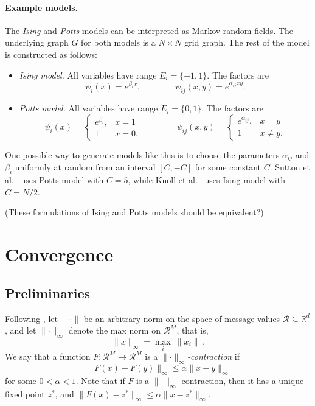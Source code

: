 \documentclass[11pt,a4paper]{article}
\theoremstyle{remark}
\newcommand{\Reals}{\mathbb{R}}
\newcommand{\R}{\mathcal{R}}
\newcommand{\range}{E}
\newcommand{\norm}[1]{\lVert #1 \rVert}
\begin{document}
\paragraph{Example models.} The \emph{Ising} and \emph{Potts} models can be interpreted as Markov random fields. The underlying graph $G$ for both models is a $N \times N$ grid graph. The rest of the model is constructed as follows:
\begin{itemize}
    \item \emph{Ising model.} All variables have range $\range_{i} = \{ -1, 1 \}$. The factors are
    \begin{equation*}
        \psi_i(x) = e^{\beta_{i} x}, \qquad\qquad
        \psi_{ij}(x,y) = e^{\alpha_{ij}xy}.
    \end{equation*}
    \item \emph{Potts model.} All variables have range $\range_{i} = \{ 0, 1 \}$. The factors are
    \begin{equation*}
        \psi_i(x) = \begin{cases} e^{\beta_{i}}, & x = 1 \\1 & x = 0, \end{cases} \qquad\qquad
        \psi_{ij}(x,y) = \begin{cases} e^{\alpha_{ij}}, & x = y \\1 & x \ne y. \end{cases}
    \end{equation*}
\end{itemize}
One possible way to generate models like this is to choose the parameters $\alpha_{ij}$ and $\beta_i$ uniformly at random from an interval $[C, -C]$ for some constant $C$. Sutton et al.~\cite{Sutton:2007:IDS:3020488.3020534} uses Potts model with $C = 5$, while Knoll et al.~\cite{10.1007/978-3-319-23525-7_18} uses Ising model with $C = N/2$.

(These formulations of Ising and Potts models should be equivalent?)


\section{Convergence}

\subsection{Preliminaries}

Following \cite{elidan2006residual}, let $\norm{\cdot}$ be an arbitrary norm on the space of message values $\R \subseteq \Reals^d$, and let $\norm{\cdot}_\infty$ denote the max norm on $\R^M$, that is, 
\[ \norm{x}_\infty = \max_{i}\  \norm{x_i}\,.\]
We say that a function $F \colon \R^M \to \R^M$ is a \emph{$\norm{\cdot}_\infty$-contraction} if
\[ \norm{ F(x) - F(y)}_{\infty} \le \alpha \norm{x - y}_\infty \]
for some $0 < \alpha < 1$. Note that if $F$ is a $\norm{\cdot}_\infty$-contraction, then it has a unique fixed point $z^*$, and $\norm{ F(x) - z^*}_{\infty} \le \alpha \norm{x - z^*}_\infty$.
\end{document}

